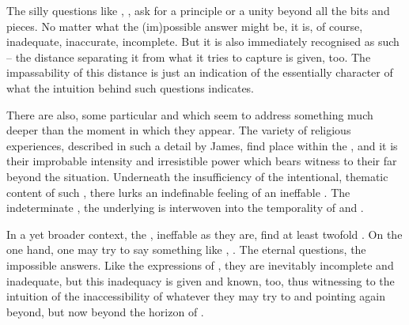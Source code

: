 {The silly questions like , 
,  ask for a principle or a unity beyond all the bits and 
pieces. 
No matter what the (im)possible answer might be, it is, of
course, inadequate, inaccurate, incomplete.  But it is also
immediately recognised as such -- the distance separating it
from what it tries to capture is given, too.  The impassability of
this distance is just an indication of the essentially 
character of what the  intuition behind such questions 
indicates.

There are also, some particular  and  which
seem to address something much deeper than the  moment in
which they appear.
%
The variety of religious experiences, described in such a detail by 
James, find place within the \hoa, and it is their improbable 
intensity and irresistible power which bears witness to their 
 far beyond the  situation. 
Underneath the insufficiency of the
intentional, thematic content of such , there lurks an
indefinable feeling of an ineffable .  The indeterminate
, the underlying  is interwoven into the
temporality of  and .

\pa\label{pa:manifest2} \mine 
In a yet broader context, the ,
ineffable as they are, find at least twofold .
On the one hand, one may try to say something like , . The eternal questions, the 
impossible answers. Like the expressions of , they are inevitably incomplete and inadequate, but this 
inadequacy is given and known, too, thus witnessing to the intuition of 
the inaccessibility of whatever they may try to  and 
pointing again beyond, but now beyond the horizon of .

}
